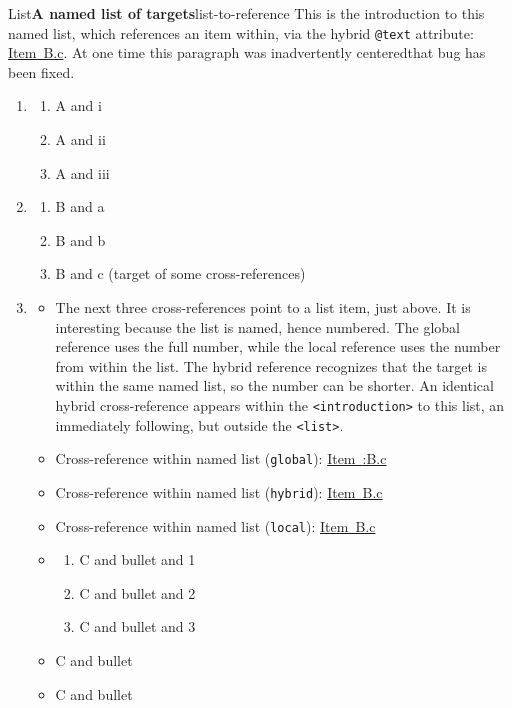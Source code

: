 \documentclass{amsart}
\theoremstyle{plain}%
\theoremstyle{definition}%
\theoremstyle{remark}%
\newcommand{\xreffont}{\relax}
\newcommand{\mono}[1]{\texttt{#1}}
\numberwithin{equation}{section}
\begin{document}
\begin{listptx}{List}{\textbf{A named list of targets}}{list-to-reference}{}%
This is the introduction to this named list, which references an item within, via the hybrid \mono{@text} attribute:  \hyperlink{target-item}{Item~B.c}.  At one time this paragraph was inadvertently centered\textemdash{}that bug has been fixed.%
%
\begin{enumerate}[label={\Alph*}]
\item{}%
\begin{enumerate}[label={\roman*}]
\item{}A and i%
\item{}A and ii%
\item{}A and iii%
\end{enumerate}
%
\item{}%
\begin{enumerate}[label={\alph*}]
\item{}B and a%
\item{}B and b%
\item\hypertarget{target-item}{}B and c (target of some cross-references)%
\end{enumerate}
%
\item{}%
\begin{itemize}[label=\textbullet]
\item{}The next three cross-references point to a list item, just above.  It is interesting because the list is named, hence numbered.  The global reference uses the full number, while the local reference uses the number from within the list.  The hybrid reference recognizes that the target is within the same named list, so the number can be shorter.  An identical hybrid cross-reference appears within the \mono{<introduction>} to this list, an immediately following, but outside the \mono{<list>}.%
\item{}Cross-reference within named list (\mono{global}): \hyperlink{target-item}{Item~{\xreffont 12.4:B.c}}%
\item{}Cross-reference within named list (\mono{hybrid}): \hyperlink{target-item}{Item~B.c}%
\item{}Cross-reference within named list (\mono{local}): \hyperlink{target-item}{Item~B.c}%
\item{}%
\begin{enumerate}[label={\arabic*}]
\item{}C and bullet and 1%
\item\hypertarget{target-no-number}{}C and bullet and 2%
\item{}C and bullet and 3%
\end{enumerate}
%
\item{}C and bullet%
\item{}C and bullet%
\end{itemize}
%
\end{enumerate}
\end{listptx}%
\end{document}

